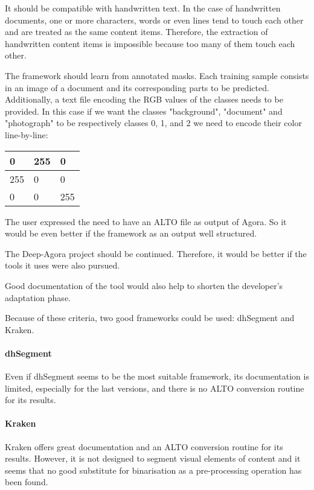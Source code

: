 \documentclass{polytech/polytech}
\numberwithin{figure}{chapter}
\begin{document}
It should be compatible with handwritten text.
In the case of handwritten documents, one or more characters, words or even lines tend to touch each other and are treated as the same content items.
Therefore, the extraction of handwritten content items is impossible because too many of them touch each other.

The framework should learn from annotated masks.
Each training sample consists in an image of a document and its corresponding parts to be predicted.
Additionally, a text file encoding the RGB values of the classes needs to be provided.
In this case if we want the classes "background", "document" and "photograph" to be respectively classes 0, 1, and 2 we need to encode their color line-by-line:
\begin{table}[]
\begin{tabular}{|lll|}\hline
0 & 255 & 0 \\\hline
255 & 0 & 0 \\\hline
0 & 0  &255 \\\hline
\end{tabular}
\end{table}

The user expressed the need to have an ALTO file as output of Agora.
So it would be even better if the framework as an output well structured.

The Deep-Agora project should be continued.
Therefore, it would be better if the tools it uses were also pursued.

Good documentation of the tool would also help to shorten the developer's adaptation phase.

Because of these criteria, two good frameworks could be used: dhSegment and Kraken.

\paragraph{dhSegment}

Even if dhSegment seems to be the most suitable framework, its documentation is limited, especially for the last versions, and there is no ALTO conversion routine for its results.

\paragraph{Kraken}

Kraken offers great documentation and an ALTO conversion routine for its results.
However, it is not designed to segment visual elements of content and it seems that no good substitute for binarisation as a pre-processing operation has been found.
\end{document}
